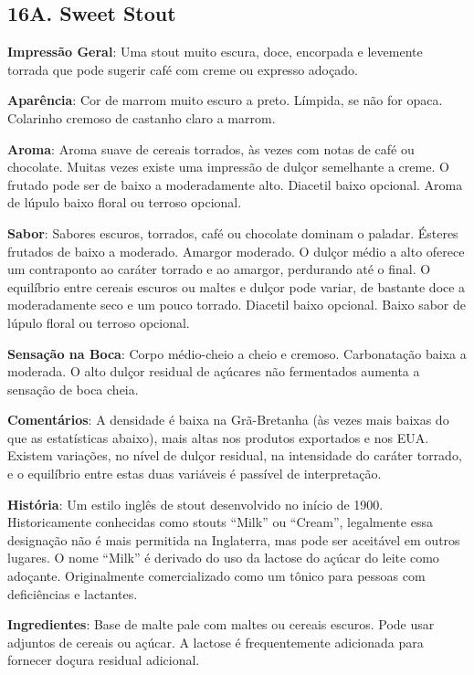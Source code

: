 \subsection*{16A. Sweet Stout}

\textbf{Impressão Geral}: Uma stout muito escura, doce, encorpada e levemente torrada que pode sugerir café com creme ou expresso adoçado.

\textbf{Aparência}: Cor de marrom muito escuro a preto. Límpida, se não for opaca. Colarinho cremoso de castanho claro a marrom.

\textbf{Aroma}: Aroma suave de cereais torrados, às vezes com notas de café ou chocolate. Muitas vezes existe uma impressão de dulçor semelhante a creme. O frutado pode ser de baixo a moderadamente alto. Diacetil baixo opcional. Aroma de lúpulo baixo floral ou terroso opcional.

\textbf{Sabor}: Sabores escuros, torrados, café ou chocolate dominam o paladar. Ésteres frutados de baixo a moderado. Amargor moderado. O dulçor médio a alto oferece um contraponto ao caráter torrado e ao amargor, perdurando até o final. O equilíbrio entre cereais escuros ou maltes e dulçor pode variar, de bastante doce a moderadamente seco e um pouco torrado. Diacetil baixo opcional. Baixo sabor de lúpulo floral ou terroso opcional.

\textbf{Sensação na Boca}: Corpo médio-cheio a cheio e cremoso. Carbonatação baixa a moderada. O alto dulçor residual de açúcares não fermentados aumenta a sensação de boca cheia.

\textbf{Comentários}: A densidade é baixa na Grã-Bretanha (às vezes mais baixas do que as estatísticas abaixo), mais altas nos produtos exportados e nos EUA. Existem variações, no nível de dulçor residual, na intensidade do caráter torrado, e o equilíbrio entre estas duas variáveis é passível de interpretação.

\textbf{História}: Um estilo inglês de stout desenvolvido no início de 1900. Historicamente conhecidas como stouts “Milk” ou “Cream”, legalmente essa designação não é mais permitida na Inglaterra, mas pode ser aceitável em outros lugares. O nome “Milk” é derivado do uso da lactose do açúcar do leite como adoçante. Originalmente comercializado como um tônico para pessoas com deficiências e lactantes.

\textbf{Ingredientes}: Base de malte pale com maltes ou cereais escuros. Pode usar adjuntos de cereais ou açúcar. A lactose é frequentemente adicionada para fornecer doçura residual adicional.

